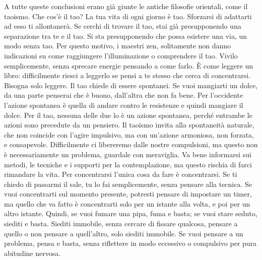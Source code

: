 \documentclass[12pt]{book} %
\begin{document}
A tutte queste conclusioni erano già giunte le antiche filosofie orientali, come il taoismo.
Che cos'è il tao? La tua vita di ogni giorno è tao. Sforzarsi di adattarti ad esso ti allontanerà. Se cerchi di trovare il tao, stai già presupponendo una separazione tra te e il tao. Si sta presupponendo che possa esistere una via, un modo senza tao. Per questo motivo, i maestri zen, solitamente non danno indicazioni su come raggiungere l'illuminazione o comprendere il tao. Vivilo semplicemente, senza sprecare energie pensando a come farlo. È come leggere un libro: difficilmente riesci a leggerlo se pensi a te stesso che cerca di concentrarsi. Bisogna solo leggere.
Il tao chiede di essere spontanei. Se vuoi mangiarti un dolce, da una parte penserai che è buono, dall'altra che non fa bene. Per l'occidente l'azione spontanea è quella di andare contro le resistenze e quindi mangiare il dolce. Per il tao, nessuna delle due lo è un azione spontanea, perché entrambe le azioni sono precedute da un pensiero. Il taoismo invita alla spontaneità naturale, che non coincide con l’agire impulsivo, ma con un'azione armoniosa, non forzata, e consapevole. Difficilmente ci libereremo dalle nostre compulsioni, ma questo non è necessariamente un problema, guardale con meraviglia.
Va bene informarsi sui metodi, le tecniche e i supporti per la contemplazione, ma questo rischia di farci rimandare la vita. Per concentrarsi l'unica cosa da fare è concentrarsi. Se ti chiedo di passarmi il sale, tu lo fai semplicemente, senza pensare alla tecnica. Se vuoi concentrarti sul momento presente, potresti pensare di impostare un timer, ma quello che va fatto è concentrarti solo per un istante alla volta, e poi per un altro istante. Quindi, se vuoi fumare una pipa, fuma e basta; se vuoi stare seduto, siediti e basta. Siediti immobile, senza cercare di fissare qualcosa, pensare a quello o non pensare a quell'altro, solo siediti immobile. Se vuoi pensare a un problema, pensa e basta, senza riflettere in modo eccessivo o compulsivo per pura abitudine nervosa.
\end{document}
